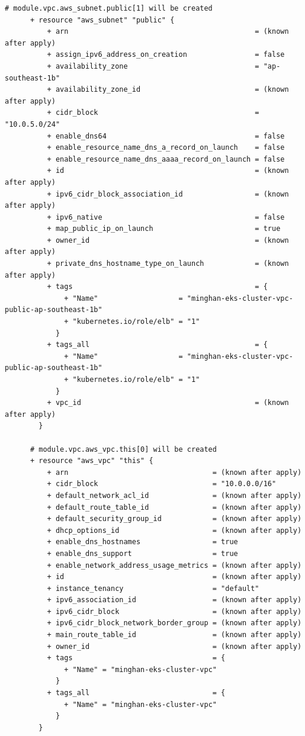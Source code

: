 \begin{lstlisting}[caption={terraform plan output for \texttt{cloudkube} provisioning}, breaklines=true, breakatwhitespace=false]
      # module.vpc.aws_subnet.public[1] will be created
      + resource "aws_subnet" "public" {
          + arn                                            = (known after apply)
          + assign_ipv6_address_on_creation                = false
          + availability_zone                              = "ap-southeast-1b"
          + availability_zone_id                           = (known after apply)
          + cidr_block                                     = "10.0.5.0/24"
          + enable_dns64                                   = false
          + enable_resource_name_dns_a_record_on_launch    = false
          + enable_resource_name_dns_aaaa_record_on_launch = false
          + id                                             = (known after apply)
          + ipv6_cidr_block_association_id                 = (known after apply)
          + ipv6_native                                    = false
          + map_public_ip_on_launch                        = true
          + owner_id                                       = (known after apply)
          + private_dns_hostname_type_on_launch            = (known after apply)
          + tags                                           = {
              + "Name"                   = "minghan-eks-cluster-vpc-public-ap-southeast-1b"
              + "kubernetes.io/role/elb" = "1"
            }
          + tags_all                                       = {
              + "Name"                   = "minghan-eks-cluster-vpc-public-ap-southeast-1b"
              + "kubernetes.io/role/elb" = "1"
            }
          + vpc_id                                         = (known after apply)
        }
    
      # module.vpc.aws_vpc.this[0] will be created
      + resource "aws_vpc" "this" {
          + arn                                  = (known after apply)
          + cidr_block                           = "10.0.0.0/16"
          + default_network_acl_id               = (known after apply)
          + default_route_table_id               = (known after apply)
          + default_security_group_id            = (known after apply)
          + dhcp_options_id                      = (known after apply)
          + enable_dns_hostnames                 = true
          + enable_dns_support                   = true
          + enable_network_address_usage_metrics = (known after apply)
          + id                                   = (known after apply)
          + instance_tenancy                     = "default"
          + ipv6_association_id                  = (known after apply)
          + ipv6_cidr_block                      = (known after apply)
          + ipv6_cidr_block_network_border_group = (known after apply)
          + main_route_table_id                  = (known after apply)
          + owner_id                             = (known after apply)
          + tags                                 = {
              + "Name" = "minghan-eks-cluster-vpc"
            }
          + tags_all                             = {
              + "Name" = "minghan-eks-cluster-vpc"
            }
        }
    

\end{lstlisting}
